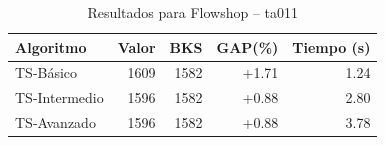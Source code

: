 \begin{table}[h]
\centering
\caption{Resultados para Flowshop -- ta011}
\label{tab:flowshop_ta011}
\begin{tabular}{lrrrr}
\hline
\textbf{Algoritmo} & \textbf{Valor} & \textbf{BKS} & \textbf{GAP(\%)} & \textbf{Tiempo (s)} \\
\hline
TS-Básico & 1609 & 1582 & +1.71 & 1.24 \\
TS-Intermedio & 1596 & 1582 & +0.88 & 2.80 \\
TS-Avanzado & 1596 & 1582 & +0.88 & 3.78 \\
\hline
\end{tabular}
\end{table}
